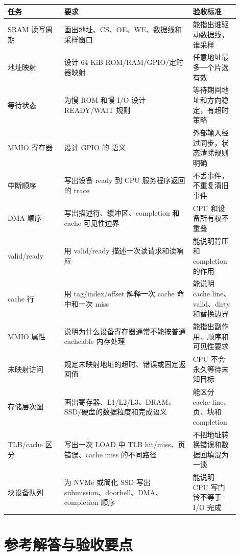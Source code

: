 \begin{longtable}{L{0.22\linewidth}L{0.5\linewidth}L{0.18\linewidth}}
\toprule
任务 & 要求 & 验收标准 \\
\midrule
SRAM 读写周期 & 画出地址、CS、OE、WE、数据线和采样窗口 & 能指出谁驱动数据线，谁采样 \\
地址映射 & 设计 64 KiB ROM/RAM/GPIO/定时器映射 & 任意地址最多一个片选有效 \\
等待状态 & 为慢 ROM 和慢 I/O 设计 READY/WAIT 规则 & 等待期间地址和方向稳定，有超时策略 \\
MMIO 寄存器 & 设计 GPIO 的  语义 & 外部输入经过同步，状态清除规则明确 \\
中断顺序 & 写出设备 ready 到 CPU 服务程序返回的 trace & 不丢事件，不重复清旧事件 \\
DMA 顺序 & 写出描述符、缓冲区、completion 和 cache 可见性边界 & CPU 和设备所有权不重叠 \\
valid/ready & 用 valid/ready 描述一次读请求和读响应 & 能说明背压和 completion 的作用 \\
cache 行 & 用 tag/index/offset 解释一次 cache 命中和一次 miss & 能说明 cache line、valid、dirty 和替换边界 \\
MMIO 属性 & 说明为什么设备寄存器通常不能按普通 cacheable 内存处理 & 能指出副作用、顺序和可见性要求 \\
未映射访问 & 规定未映射地址的超时、错误或固定返回值 & CPU 不会永久等待未知目标 \\
存储层次图 & 画出寄存器、L1/L2/L3、DRAM、SSD/硬盘的数据粒度和完成语义 & 能区分 cache line、页、块和 completion \\
TLB/cache 区分 & 写出一次 LOAD 中 TLB hit/miss、页错误、cache miss 的不同路径 & 不把地址转换错误和数据回填混为一谈 \\
块设备队列 & 为 NVMe 或简化 SSD 写出 submission、doorbell、DMA、completion 顺序 & 能说明 CPU 写门铃不等于 I/O 完成 \\
\bottomrule
\end{longtable}

\section*{参考解答与验收要点}

